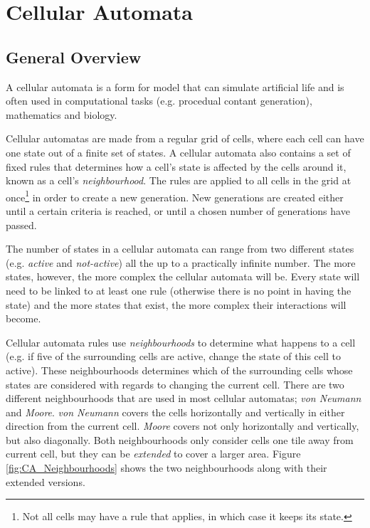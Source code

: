 \section{Cellular Automata}
\label{CA}

\subsection{General Overview}
\label{CA_General}

A cellular automata is a form for model that can simulate artificial life and is often used in computational tasks (e.g. procedual contant generation\cite{togelius2011search}), mathematics and biology. 

Cellular automatas are made from a regular grid of cells, where each cell can have one state out of a finite set of states. A cellular automata also contains a set of fixed rules that determines how a cell's state is affected by the cells around it, known as a cell's \textit{neighbourhood}. The rules are applied to all cells in the grid at once\footnote{Not all cells may have a rule that applies, in which case it keeps its state.} in order to create a new generation. New generations are created either until a certain criteria is reached, or until a chosen number of generations have passed.

The number of states in a cellular automata can range from two different states (e.g. \textit{active} and \textit{not-active}) all the up to a practically infinite number. The more states, however, the more complex the cellular automata will be. Every state will need to be linked to at least one rule (otherwise there is no point in having the state) and the more states that exist, the more complex their interactions will become.

Cellular automata rules use \textit{neighbourhoods} to determine what happens to a cell (e.g. if five of the surrounding cells are active, change the state of this cell to active). These neighbourhoods determines which of the surrounding cells whose states are considered with regards to changing the current cell. There are two different neighbourhoods that are used in most cellular automatas; \textit{von Neumann} and \textit{Moore}. \textit{von Neumann} covers the cells horizontally and vertically in either direction from the current cell. \textit{Moore} covers not only horizontally and vertically, but also diagonally. Both neighbourhoods only consider cells one tile away from current cell, but they can be \textit{extended} to cover a larger area. Figure \ref{fig:CA_Neighbourhoods} shows the two neighbourhoods along with their extended versions.

